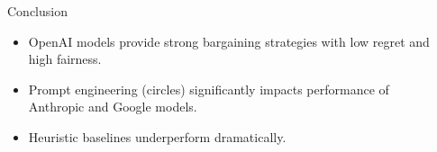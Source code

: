 \documentclass[final]{beamer}
\newlength{\sepwidth}
\newlength{\colwidth}
\newcommand{\separatorcolumn}{\begin{column}{\sepwidth}\end{column}}
\begin{document}
\begin{frame}[t]
\begin{columns}[t]
\begin{column}{\colwidth}
  \begin{block}{Conclusion}
  \begin{itemize}
    \item OpenAI models provide strong bargaining strategies with low regret and
          high fairness.
    \item Prompt engineering (circles) significantly impacts performance of
          Anthropic and Google models.
    \item Heuristic baselines underperform dramatically.
  \end{itemize}
  \end{block}

\end{column}

\separatorcolumn
\end{columns}
\end{frame}
\end{document}
